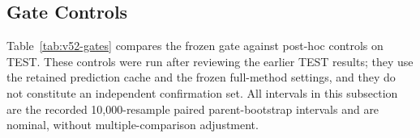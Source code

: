 \documentclass{article}
\begin{document}
\begin{table}[htbp]
  \caption{Stratum-boundary sensitivity. The no-op tolerance and the low and high boundary are
  shifted by the indicated factor of the bank threshold, and every other setting is unchanged.
  MASE is source-macro averaged within the resulting strata.}
  \label{tab:app-opp-sens}
  \centering
  \small
  \setlength{\tabcolsep}{4pt}
\end{table}

\subsection{Gate Controls}
\label{app:gate-controls}
Table~\ref{tab:v52-gates} compares the frozen gate against post-hoc controls on TEST.
These controls were run after reviewing the earlier TEST results; they use the retained
prediction cache and the frozen full-method settings, and they do not constitute an
independent confirmation set. All intervals in this subsection are the recorded
10,000-resample paired parent-bootstrap intervals and are nominal, without
multiple-comparison adjustment.
\end{document}
